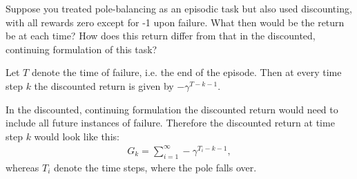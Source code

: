 
\begin{exercise}[Exercise 3.6]

Suppose you treated pole-balancing as an episodic task but also used discounting,
with all rewards zero except for -1 upon failure. What then would be the return
be at each time? How does this return differ from that in the discounted, continuing
formulation of this task?

\end{exercise}


\begin{solution}

Let $T$ denote the time of failure, i.e. the end of the episode.
Then at every time step $k$ the discounted return is given by $-\gamma^{T-k-1}$.

In the discounted, continuing formulation the discounted return would need to
include all future instances of failure.
Therefore the discounted return at time step $k$ would look like this:
\begin{align*}
  G_k = \sum_{i = 1}^{\infty} -\gamma^{T_i -k-1},
\end{align*}
whereas $T_i$ denote the time steps, where the pole falls over.

\end{solution}

